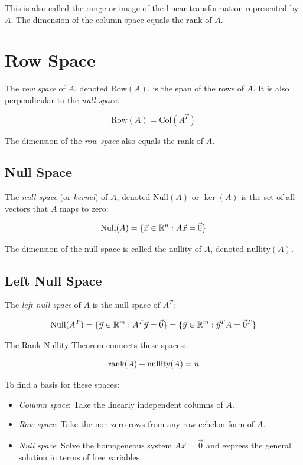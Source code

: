 This is also called the range or image of the linear transformation represented by \(A\). The dimension of the column space equals the rank of \(A\).

\section{Row Space}

The \emph{row space} of \(A\), denoted \(\text{Row}(A)\), is the span of the rows of \(A\). It is also perpendicular to the \emph{null space}.

\[
    \mathrm{Row}(A) = \text{Col}(A^T)
\]

The dimension of the \emph{row space} also equals the rank of \(A\).

\subsection{Null Space}

The \emph{null space} (or \emph{kernel}) of \(A\), denoted \(\mathrm{Null}(A)\) or \(\ker(A)\) is the set of all vectors that \(A\) maps to zero:

\[
    \mathrm{Null}(A) = \{\vec{x} \in \mathbb{R}^n : A\vec{x} = \vec{0}\}
\]

The dimension of the null space is called the nullity of \(A\), denoted \(\mathrm{nullity}(A)\).

\subsection{Left Null Space}

The \emph{left null space} of \(A\) is the null space of \(A^T\):

\[
    \mathrm{Null}(A^T) = \{\vec{y} \in \mathbb{R}^m : A^T\vec{y} = \vec{0}\} = \{\vec{y} \in \mathbb{R}^m : \vec{y}^T A = \vec{0}^T\}
\]

The Rank-Nullity Theorem connects these spaces:

\[
    \mathrm{rank}(A) + \mathrm{nullity}(A) = n
\]

To find a basis for these spaces:

\begin{itemize}

    \item \emph{Column space}: Take the linearly independent columns of \(A\).

    \item \emph{Row space}: Take the non-zero rows from any row echelon form of \(A\).

    \item \emph{Null space}: Solve the homogeneous system \(A\vec{x} = \vec{0}\) and express the general
          solution in terms of free variables.

\end{itemize}

